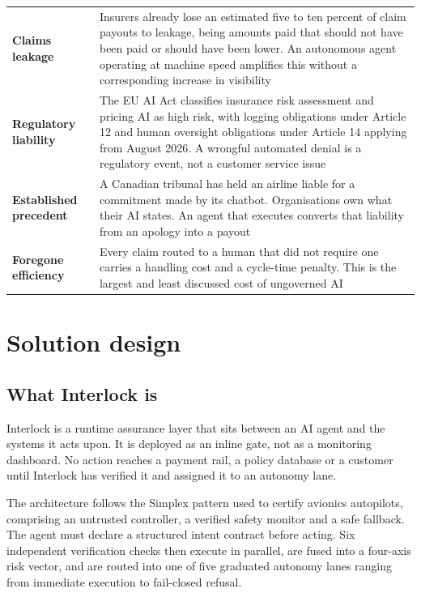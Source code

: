 \documentclass[10pt]{article}
\begin{document}
\vspace{2pt}
{\small
\begin{xltabular}{\textwidth}{@{}L{0.24\textwidth}Y@{}}
\toprule
{} &  \\
\midrule
\textbf{Claims leakage} & Insurers already lose an estimated five to ten percent of claim payouts to leakage, being amounts paid that should not have been paid or should have been lower. An autonomous agent operating at machine speed amplifies this without a corresponding increase in visibility \\
\textbf{Regulatory liability} & The EU AI Act classifies insurance risk assessment and pricing AI as high risk, with logging obligations under Article 12 and human oversight obligations under Article 14 applying from August 2026. A wrongful automated denial is a regulatory event, not a customer service issue \\
\textbf{Established precedent} & A Canadian tribunal has held an airline liable for a commitment made by its chatbot. Organisations own what their AI states. An agent that executes converts that liability from an apology into a payout \\
\textbf{Foregone efficiency} & Every claim routed to a human that did not require one carries a handling cost and a cycle-time penalty. This is the largest and least discussed cost of ungoverned AI \\
\bottomrule
\end{xltabular}}

\section{Solution design}

\subsection{What Interlock is}

Interlock is a runtime assurance layer that sits between an AI agent and the systems it
acts upon. It is deployed as an inline gate, not as a monitoring dashboard. No action
reaches a payment rail, a policy database or a customer until Interlock has verified it
and assigned it to an autonomy lane.

The architecture follows the Simplex pattern used to certify avionics autopilots,
comprising an untrusted controller, a verified safety monitor and a safe fallback. The
agent must declare a structured intent contract before acting. Six independent
verification checks then execute in parallel, are fused into a four-axis risk vector, and
are routed into one of five graduated autonomy lanes ranging from immediate execution to
fail-closed refusal.
\end{document}
